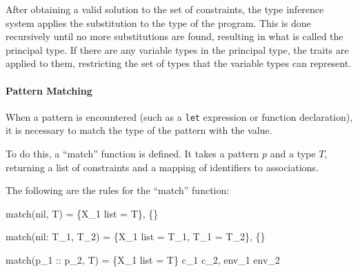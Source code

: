 \documentclass{article}
\begin{document}
After obtaining a valid solution to the set of constraints, the type inference system applies the substitution to the type of the program.
This is done recursively until no more substitutions are found, resulting in what is called the principal type.
If there are any variable types in the principal type, the traits are applied to them, restricting the set of types that the variable types can represent.

\paragraph{Pattern Matching}

When a pattern is encountered (such as a \texttt{let} expression or function declaration), it is necessary to match the type of the pattern with the value.

To do this, a ``match'' function is defined.
It takes a pattern $p$ and a type $T$, returning a list of constraints and a mapping of identifiers to associations.

The following are the rules for the ``match'' function:











\smallskip

    {match(nil, T) = \{X_1 list = T\}, \{\}}

    {match(nil: T_1, T_2) = \{X_1 list = T_1, T_1 = T_2\}, \{\}}

\smallskip

    {match(p_1 :: p_2, T) = \{X_1 list = T\} \cup c_1 \cup c_2, env_1 \cup env_2}
\end{document}
